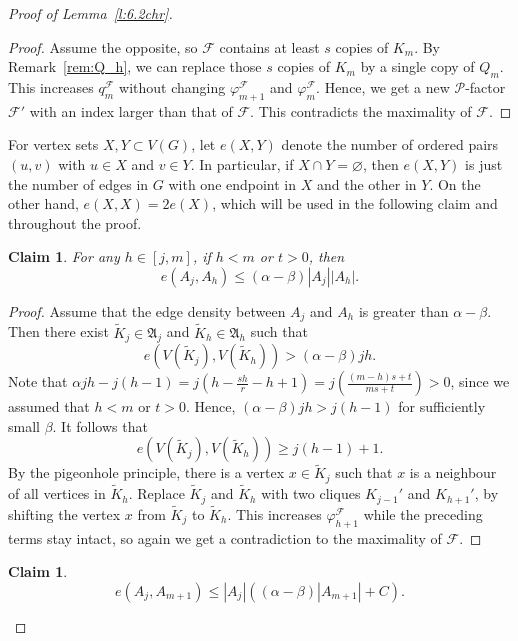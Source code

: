 \documentclass[reqno, 12pt]{amsart}
\numberwithin{equation}{section}
\numberwithin{figure}{section}
\theoremstyle{plain}
\newtheorem{claim}[thm]{Claim}
\theoremstyle{definition}
\let\phi=\varphi
\def\cF{{\mathcal F}}
\def\cP{{\mathcal P}}
\def\fA{\mathfrak{A}}
\let\emptyset=\varnothing
\let\Pc=\cP
\begin{document}
\begin{proof}[Proof of Lemma~\ref{l:6.2chr}]
        \begin{proof}
            Assume the opposite, so $\cF$ contains at least $s$ copies of $K_m$. By Remark~\ref{rem:Q_h}, we can replace those $s$ copies of $K_m$ by a single copy of $Q_m$. This increases $q_m^\cF$ without changing $\varphi_{m+1}^{\cF}$ and $\varphi_m^{\cF}$.  Hence, we get a new $\Pc$-factor $\cF'$ with an index larger than that of $\cF$. This contradicts the maximality of $\cF$.  
        \end{proof}

        For vertex sets $X,Y\subset V(G)$, let $e(X,Y)$ denote the number of ordered pairs $(u,v)$ with $u\in X$ and $v\in Y$. In particular, if $X\cap Y=\emptyset$, then $e(X,Y)$ is just the number of edges in $G$ with one endpoint in $X$ and the other in $Y$. On the other hand, $e(X, X) = 2e(X)$, which will be used in the following claim and throughout the proof.
        
        \begin{claim}
            \label{c:p-A-edges-in-[p,m]}
            For any $h\in [j,m]$, if $h<m$ or $t>0$, then 
            $$e(A_j,A_h)\leq (\alpha-\beta)|A_j||A_h|.$$
        \end{claim}
       
        \begin{proof}
            Assume that the edge density between $A_j$ and $A_h$ is greater than $\alpha-\beta$.
            Then there exist $\tilde K_j\in \fA_j$ and $\tilde K_h\in \fA_h$ such that $$e(V(\tilde K_j),V(\tilde K_h))>(\alpha-\beta)jh.$$ 
            Note that
            $\alpha jh - j(h-1) = j\left(h-\frac{sh}{r}-h+1 \right)=j\left(\frac{(m-h)s+t}{ms+t}\right)>0$, since we assumed that $h<m$ or $t>0$. Hence,  $(\alpha-\beta) jh > j(h-1)$ for sufficiently small $\beta$. It follows that $$e(V(\tilde K_j),V(\tilde K_h))\geq j(h-1)+1.$$ By the pigeonhole principle, there is a vertex $x\in \tilde K_j$ such that $x$ is a neighbour of all vertices in $\tilde K_h$. Replace $\tilde K_j$ and $\tilde K_h$ with two cliques $ K_{j-1}'$ and $ K_{h+1}'$, by shifting the vertex $x$ from $\tilde K_j$ to $\tilde K_h$. This increases $\phi_{h+1}^\cF$ while the preceding terms stay intact, so again we get a contradiction to the maximality of $\cF$. 
        \end{proof}

        \begin{claim}
            \label{c:p-A-edges-in-m+1}
            $$e(A_j,A_{m+1})\leq |A_j|\left((\alpha-\beta)|A_{m+1}|+C\right).$$
        \end{claim}


\end{proof}
\end{document}
